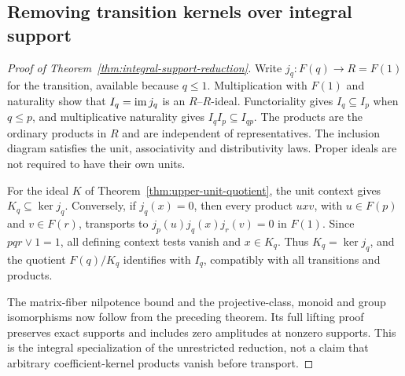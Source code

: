 \subsection{Removing transition kernels over integral support}
\label{subsec:integral-support-reduction}

\begin{proof}[Proof of Theorem~\ref{thm:integral-support-reduction}]
Write $j_q:F(q)\to R=F(1)$ for the transition, available because
$q\leq1$. Multiplication with $F(1)$ and naturality show that
$I_q=\operatorname{im} j_q$ is an $R$--$R$-ideal. Functoriality gives
$I_q\subseteq I_p$ when $q\leq p$, and multiplicative naturality gives
$I_qI_p\subseteq I_{qp}$. The products are the ordinary products in
$R$ and are independent of representatives. The inclusion diagram
satisfies the unit, associativity and distributivity laws. Proper
ideals are not required to have their own units.

For the ideal $K$ of Theorem~\ref{thm:upper-unit-quotient}, the unit
context gives $K_q\subseteq\ker j_q$. Conversely, if $j_q(x)=0$,
then every product $uxv$, with $u\in F(p)$ and $v\in F(r)$,
transports to $j_p(u)j_q(x)j_r(v)=0$ in $F(1)$. Since
$pqr\vee1=1$, all defining context tests vanish and $x\in K_q$.
Thus $K_q=\ker j_q$, and the quotient $F(q)/K_q$ identifies with
$I_q$, compatibly with all transitions and products.

The matrix-fiber nilpotence bound and the projective-class, monoid
and group isomorphisms now follow from the preceding theorem.
Its full lifting proof preserves exact supports and includes zero
amplitudes at nonzero supports. This is the integral specialization
of the unrestricted reduction, not a claim that arbitrary
coefficient-kernel products vanish before transport.
\end{proof}
